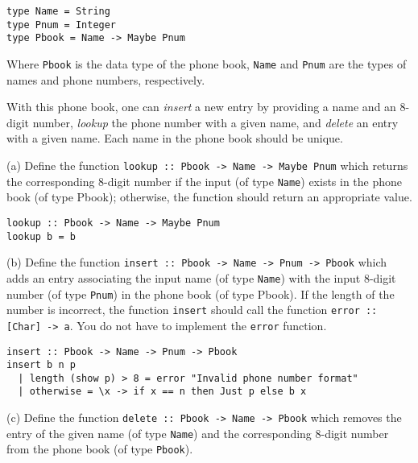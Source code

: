 \documentclass{article}
\begin{document}
    \begin{lstlisting}
type Name = String 
type Pnum = Integer 
type Pbook = Name -> Maybe Pnum
    \end{lstlisting}

    Where \texttt{Pbook} is the data type of the phone book, \texttt{Name} and \texttt{Pnum} are the types of names and phone numbers, respectively.
    \medskip

    With this phone book, one can \textit{insert} a new entry by providing a name and an 8-digit number, \textit{lookup} the phone number with a given name, and \textit{delete} an entry with a given name. Each name in the phone book should be unique.
    \medskip

    (a) Define the function \texttt{lookup :: Pbook -> Name -> Maybe Pnum} which returns the corresponding 8-digit number if the input (of type \texttt{Name}) exists in the phone book (of type Pbook); otherwise, the function should return an appropriate value.

    \begin{ans}
        \hspace{1em}
        \begin{lstlisting}
lookup :: Pbook -> Name -> Maybe Pnum
lookup b = b
        \end{lstlisting}
    \end{ans}

    (b) Define the function \texttt{insert :: Pbook -> Name -> Pnum -> Pbook} which adds an entry associating the input name (of type \texttt{Name}) with the input 8-digit number (of type \texttt{Pnum}) in the phone book (of type Pbook). If the length of the number is incorrect, the function \texttt{insert} should call the function \texttt{error :: [Char] -> a}. You do not have to implement the \texttt{error} function.

    \begin{ans}
        \hspace{1em}
       \begin{lstlisting}
insert :: Pbook -> Name -> Pnum -> Pbook
insert b n p
  | length (show p) > 8 = error "Invalid phone number format"
  | otherwise = \x -> if x == n then Just p else b x
       \end{lstlisting} 
    \end{ans}

    (c) Define the function \texttt{delete :: Pbook -> Name -> Pbook} which removes the entry of the given name (of type \texttt{Name}) and the corresponding 8-digit number from the phone book (of type \texttt{Pbook}).
\end{document}
